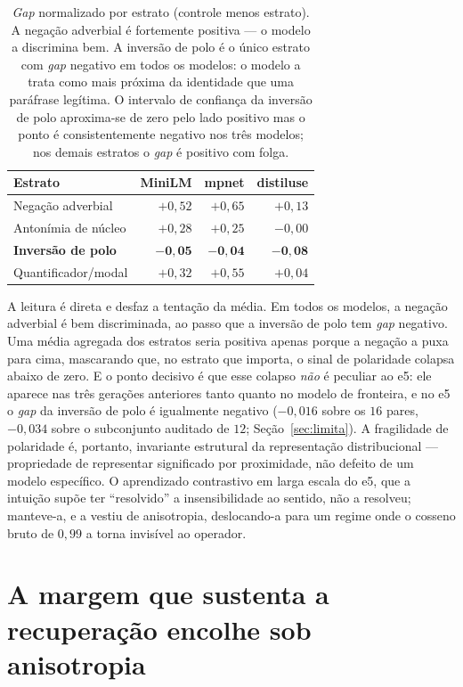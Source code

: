 \documentclass[11pt]{article}
\begin{document}
\begin{table}[H]
\centering
\small
\begin{tabular}{lrrr}
\toprule
Estrato & MiniLM & mpnet & distiluse \\
\midrule
Negação adverbial & $+0{,}52$ & $+0{,}65$ & $+0{,}13$ \\
Antonímia de núcleo & $+0{,}28$ & $+0{,}25$ & $-0{,}00$ \\
\textbf{Inversão de polo} & $\mathbf{-0{,}05}$ & $\mathbf{-0{,}04}$ & $\mathbf{-0{,}08}$ \\
Quantificador/modal & $+0{,}32$ & $+0{,}55$ & $+0{,}04$ \\
\bottomrule
\end{tabular}
\caption{\textit{Gap} normalizado por estrato (controle menos estrato). A negação
adverbial é fortemente positiva --- o modelo a discrimina bem. A inversão de polo é
o único estrato com \textit{gap} negativo em todos os modelos: o modelo a trata
como mais próxima da identidade que uma paráfrase legítima. O intervalo de
confiança da inversão de polo aproxima-se de zero pelo lado positivo mas o ponto é
consistentemente negativo nos três modelos; nos demais estratos o \textit{gap} é
positivo com folga.}
\label{tab:gaps}
\end{table}

A leitura é direta e desfaz a tentação da média. Em todos os modelos, a negação
adverbial é bem discriminada, ao passo que a inversão de polo tem \textit{gap}
negativo. Uma média agregada dos estratos seria positiva apenas porque a negação a
puxa para cima, mascarando que, no estrato que importa, o sinal de polaridade
colapsa abaixo de zero. E o ponto decisivo é que esse colapso \emph{não} é
peculiar ao e5: ele aparece nas três gerações anteriores tanto quanto no modelo de
fronteira, e no e5 o \textit{gap} da inversão de polo é igualmente negativo
($-0{,}016$ sobre os $16$ pares, $-0{,}034$ sobre o subconjunto auditado de
$12$; Seção~\ref{sec:limita}). A fragilidade de polaridade é, portanto, invariante
estrutural da representação distribucional --- propriedade de representar
significado por proximidade, não defeito de um modelo específico. O aprendizado
contrastivo em larga escala do e5, que a intuição supõe ter ``resolvido'' a
insensibilidade ao sentido, não a resolveu; manteve-a, e a vestiu de anisotropia,
deslocando-a para um regime onde o cosseno bruto de $0{,}99$ a torna invisível ao
operador.

\section{A margem que sustenta a recuperação encolhe sob anisotropia}
\label{sec:paradoxo}
\end{document}
